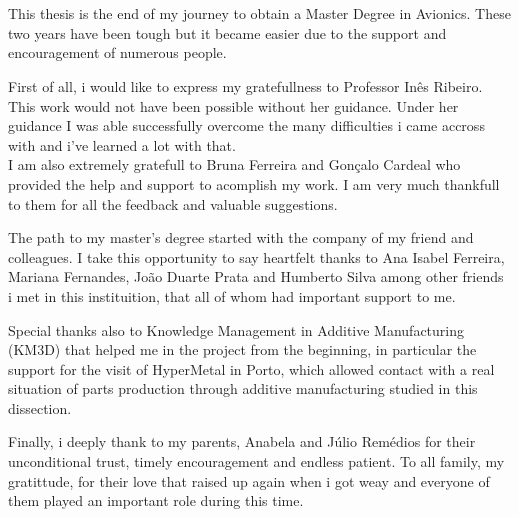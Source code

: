 
\section*{\acknowledgments}

\vspace{50}

\hspace{10} This thesis is the end of my journey to obtain a Master Degree in Avionics. These two years have been tough but it became easier due to the support and encouragement of numerous people. \par
First of all, i would like to express my gratefullness to Professor Inês Ribeiro. This work would not have been possible without her guidance. Under her guidance I was able successfully overcome the many difficulties i came accross with and i've learned a lot with that.\\
I am also extremely gratefull to Bruna  Ferreira and Gonçalo Cardeal who provided the help and support to acomplish my work. I am very much thankfull to them for all the feedback and valuable suggestions.\par
The path to my master's degree started with the company of my friend and colleagues. I take this opportunity to say heartfelt thanks to Ana Isabel Ferreira, Mariana Fernandes, João Duarte Prata and Humberto Silva among other friends i met in this instituition, that all of whom had important support to me.\par
Special thanks also to Knowledge Management in Additive Manufacturing (KM3D) that helped me in the project from the beginning, in particular the support for the visit of HyperMetal in Porto, which allowed contact with a real situation of parts production through additive manufacturing studied in this dissection.\par
Finally, i deeply thank to my parents, Anabela and Júlio Remédios for their unconditional trust, timely encouragement and endless patient. To all family, my gratittude, for their love that raised up again when i got weay and everyone of them played an important role during this time.


